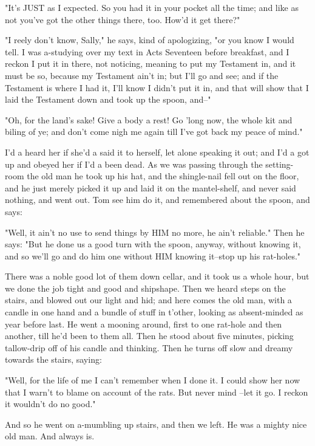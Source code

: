 "It's JUST as I expected.  So you had it in your pocket all the time; and
like as not you've got the other things there, too.  How'd it get there?"

"I reely don't know, Sally," he says, kind of apologizing, "or you know I
would tell.  I was a-studying over my text in Acts Seventeen before
breakfast, and I reckon I put it in there, not noticing, meaning to put
my Testament in, and it must be so, because my Testament ain't in; but
I'll go and see; and if the Testament is where I had it, I'll know I
didn't put it in, and that will show that I laid the Testament down and
took up the spoon, and--"

"Oh, for the land's sake!  Give a body a rest!  Go 'long now, the whole
kit and biling of ye; and don't come nigh me again till I've got back my
peace of mind."

I'd a heard her if she'd a said it to herself, let alone speaking it out;
and I'd a got up and obeyed her if I'd a been dead.  As we was passing
through the setting-room the old man he took up his hat, and the
shingle-nail fell out on the floor, and he just merely picked it up and
laid it on the mantel-shelf, and never said nothing, and went out.  Tom
see him do it, and remembered about the spoon, and says:

"Well, it ain't no use to send things by HIM no more, he ain't reliable."
Then he says:  "But he done us a good turn with the spoon, anyway,
without knowing it, and so we'll go and do him one without HIM knowing
it--stop up his rat-holes."

There was a noble good lot of them down cellar, and it took us a whole
hour, but we done the job tight and good and shipshape.  Then we heard
steps on the stairs, and blowed out our light and hid; and here comes the
old man, with a candle in one hand and a bundle of stuff in t'other,
looking as absent-minded as year before last.  He went a mooning around,
first to one rat-hole and then another, till he'd been to them all.  Then
he stood about five minutes, picking tallow-drip off of his candle and
thinking.  Then he turns off slow and dreamy towards the stairs, saying:

"Well, for the life of me I can't remember when I done it.  I could show
her now that I warn't to blame on account of the rats.  But never mind
--let it go.  I reckon it wouldn't do no good."

And so he went on a-mumbling up stairs, and then we left.  He was a
mighty nice old man.  And always is.

